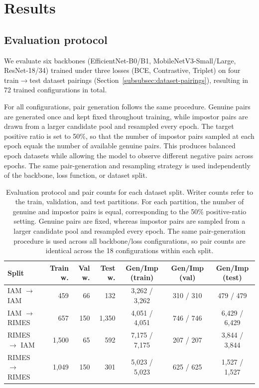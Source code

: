 \section{Results}
\label{sec:results}

\subsection{Evaluation protocol} \label{sec:protocol}

We evaluate six backbones (EfficientNet-B0/B1, MobileNetV3-Small/Large, ResNet-18/34) trained under three losses (BCE, Contrastive, Triplet) on four train$\to$test dataset pairings (Section~\ref{subsubsec:dataset-pairings}), resulting in 72 trained configurations in total.

For all configurations, pair generation follows the same procedure. Genuine pairs are generated once and kept fixed throughout training, while impostor pairs are drawn from a larger candidate pool and resampled every epoch. The target positive ratio is set to 50\%, so that the number of impostor pairs sampled at each epoch equals the number of available genuine pairs. This produces balanced epoch datasets while allowing the model to observe different negative pairs across epochs. The same pair-generation and resampling strategy is used independently of the backbone, loss function, or dataset split.

\begin{table}[htbp]
\centering
\caption{Evaluation protocol and pair counts for each dataset split. Writer counts refer to the train, validation, and test partitions. For each partition, the number of genuine and impostor pairs is equal, corresponding to the 50\% positive-ratio setting. Genuine pairs are fixed, whereas impostor pairs are sampled from a larger candidate pool and resampled every epoch. The same pair-generation procedure is used across all backbone/loss configurations, so pair counts are identical across the 18 configurations within each split.}
\label{tab:protocol}
\begin{tabular}{lrrrccc}
\toprule
Split & Train w. & Val w. & Test w. &
Gen/Imp (train) &
Gen/Imp (val) &
Gen/Imp (test) \\
\midrule
IAM $\to$ IAM
& 459 & 66 & 132
& 3{,}262 / 3{,}262
& 310 / 310
& 479 / 479 \\

IAM $\to$ RIMES
& 657 & 150 & 1{,}350
& 4{,}051 / 4{,}051
& 746 / 746
& 6{,}429 / 6{,}429 \\

RIMES $\to$ IAM
& 1{,}500 & 65 & 592
& 7{,}175 / 7{,}175
& 207 / 207
& 3{,}844 / 3{,}844 \\

RIMES $\to$ RIMES
& 1{,}049 & 150 & 301
& 5{,}023 / 5{,}023
& 625 / 625
& 1{,}527 / 1{,}527 \\
\bottomrule
\end{tabular}
\end{table}

